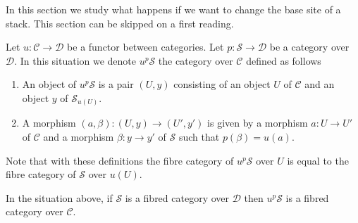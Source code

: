 \noindent
In this section we study what happens if we want to change the base site
of a stack. This section can be skipped on a first reading.

\medskip\noindent
Let $u : \mathcal{C} \to \mathcal{D}$ be a functor between categories.
Let $p : \mathcal{S} \to \mathcal{D}$ be a category over $\mathcal{D}$.
In this situation we denote $u^p\mathcal{S}$ the category over $\mathcal{C}$
defined as follows
\begin{enumerate}
\item An object of $u^p\mathcal{S}$ is a pair $(U, y)$ consisting
of an object $U$ of $\mathcal{C}$ and an object $y$ of $\mathcal{S}_{u(U)}$.
\item A morphism $(a, \beta) : (U, y) \to (U', y')$ is given by
a morphism $a : U \to U'$ of $\mathcal{C}$ and a morphism $\beta : y \to y'$
of $\mathcal{S}$ such that $p(\beta) = u(a)$.
\end{enumerate}
Note that with these definitions the fibre category of
$u^p\mathcal{S}$ over $U$ is equal to the fibre category of
$\mathcal{S}$ over $u(U)$.

\begin{lemma}
\label{lemma-fibred-category-pushforward}
In the situation above, if $\mathcal{S}$ is a fibred category over
$\mathcal{D}$ then $u^p\mathcal{S}$ is a fibred category over $\mathcal{C}$.
\end{lemma}


